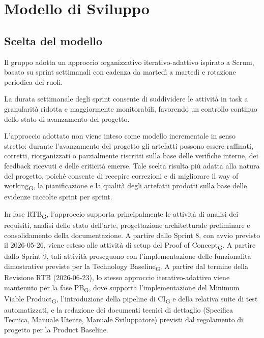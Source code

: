 \section{Modello di Sviluppo}

\subsection{Scelta del modello}

Il gruppo adotta un approccio organizzativo iterativo-adattivo ispirato a Scrum,
basato su sprint settimanali con cadenza da martedì a martedì e rotazione
periodica dei ruoli.

La durata settimanale degli sprint consente di suddividere le attività in task
a granularità ridotta e maggiormente monitorabili, favorendo un controllo
continuo dello stato di avanzamento del progetto.

L'approccio adottato non viene inteso come modello incrementale in senso stretto:
durante l'avanzamento del progetto gli artefatti possono essere raffinati,
corretti, riorganizzati o parzialmente riscritti sulla base delle verifiche
interne, dei feedback ricevuti e delle criticità emerse. Tale scelta risulta più
adatta alla natura del progetto, poiché consente di recepire correzioni e di
migliorare il way of working\textsubscript{G}, la pianificazione
e la qualità degli artefatti prodotti sulla base delle evidenze raccolte sprint per sprint.

In fase RTB\textsubscript{G}, l'approccio supporta principalmente le attività di
analisi dei requisiti, analisi dello stato dell'arte, progettazione architetturale
preliminare e consolidamento della documentazione. A partire dallo Sprint 8, con
avvio previsto il 2026-05-26, viene esteso alle attività di setup del Proof of
Concept\textsubscript{G}. A partire dallo Sprint 9, tali attività proseguono con
l'implementazione delle funzionalità dimostrative previste per la Technology
Baseline\textsubscript{G}. A partire dal termine della Revisione RTB
(2026-06-23), lo stesso approccio iterativo-adattivo viene mantenuto per la fase
PB\textsubscript{G}, dove supporta l'implementazione del Minimum Viable
Product\textsubscript{G}, l'introduzione della pipeline di CI\textsubscript{G} e
della relativa suite di test automatizzati, e la redazione dei documenti tecnici
di dettaglio (Specifica Tecnica, Manuale Utente, Manuale Sviluppatore) previsti
dal regolamento di progetto per la Product Baseline.


